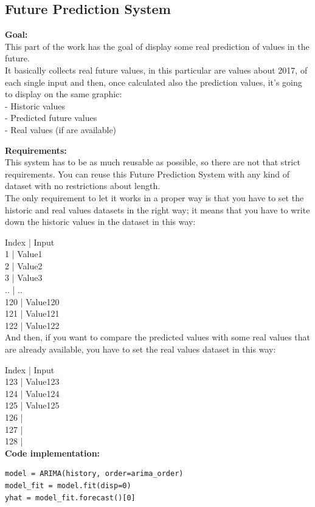 \newpage
\subsection{Future Prediction System}
\textbf{Goal:}\\ 
This part of the work has the goal of display some real prediction of values in the future. \\
It basically collects real future values, in this particular are values about 2017, of each single input and then, once calculated also the prediction values, it's going to display on the same graphic:\\
- Historic values\\
- Predicted future values\\
- Real values (if are available)

\textbf{Requirements:}\\
This system has to be as much reusable as possible, so there are not that strict requirements. You can reuse this Future Prediction System with any kind of dataset with no restrictions about length. \\
The only requirement to let it works in a proper way is that you have to set the historic and real values datasets in the right way; it means that you have to write down the historic values in the dataset in this way:

Index | Input\\
1	  |	Value1\\
2	  |	Value2\\
3	  |	Value3\\
..	  |	..\\
120	  |	Value120\\
121	  |	Value121\\
122   |	Value122\\

And then, if you want to compare the predicted values with some real values that are already available, you have to set the real values dataset in this way:

Index | Input\\
123	  |	Value123\\
124	  |	Value124\\
125	  |	Value125\\
126	  |	\\
127	  |	\\
128   |	\\

\textbf{Code implementation:}\\
\begin{lstlisting}
model = ARIMA(history, order=arima_order)
model_fit = model.fit(disp=0)
yhat = model_fit.forecast()[0]
\end{lstlisting}


